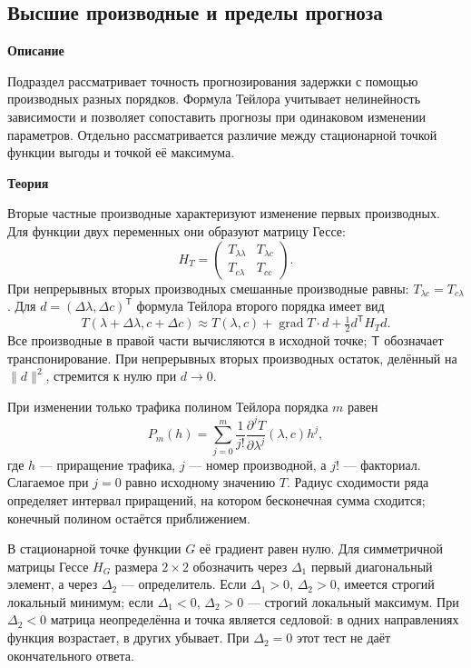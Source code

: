 \documentclass[12pt,a4paper]{article}
\newcommand{\taskhead}[1]{\par\textbf{#1}\par}
\begin{document}
\subsection{Высшие производные и пределы прогноза}
\taskhead{Описание}
Подраздел рассматривает точность прогнозирования задержки с помощью
производных разных порядков. Формула Тейлора учитывает нелинейность зависимости
и позволяет сопоставить прогнозы при одинаковом изменении параметров.
Отдельно рассматривается различие между стационарной точкой функции выгоды
и точкой её максимума.
\taskhead{Теория}
Вторые частные производные характеризуют изменение первых производных.
Для функции двух переменных они образуют матрицу Гессе:
\[
H_T=\begin{pmatrix}T_{\lambda\lambda}&T_{\lambda c}\\
T_{c\lambda}&T_{cc}\end{pmatrix}.
\]
При непрерывных вторых производных смешанные производные равны:
$T_{\lambda c}=T_{c\lambda}$.
Для $d=(\Delta\lambda,\Delta c)^{\mathsf T}$ формула Тейлора второго порядка имеет вид
\[
T(\lambda+\Delta\lambda,c+\Delta c)
\approx T(\lambda,c)+\operatorname{grad}T\cdot d+\tfrac12d^{\mathsf T}H_Td.
\]
Все производные в правой части вычисляются в исходной точке;
$\mathsf T$ обозначает транспонирование. При непрерывных вторых производных
остаток, делённый на $\|d\|^2$, стремится к нулю при $d\to0$.

При изменении только трафика полином Тейлора порядка $m$ равен
\[
P_m(h)=\sum_{j=0}^{m}\frac{1}{j!}
\frac{\partial^jT}{\partial\lambda^j}(\lambda,c)h^j,
\]
где $h$ --- приращение трафика, $j$ --- номер производной, а $j!$ --- факториал.
Слагаемое при $j=0$ равно исходному значению $T$.
Радиус сходимости ряда определяет интервал приращений, на котором
бесконечная сумма сходится; конечный полином остаётся приближением.

В стационарной точке функции $G$ её градиент равен нулю.
Для симметричной матрицы Гессе $H_G$ размера $2\times2$ обозначить
через $\Delta_1$ первый диагональный элемент, а через $\Delta_2$ --- определитель.
Если $\Delta_1>0$, $\Delta_2>0$, имеется строгий локальный минимум;
если $\Delta_1<0$, $\Delta_2>0$ --- строгий локальный максимум.
При $\Delta_2<0$ матрица неопределённа и точка является седловой:
в одних направлениях функция возрастает, в других убывает.
При $\Delta_2=0$ этот тест не даёт окончательного ответа.
\end{document}

